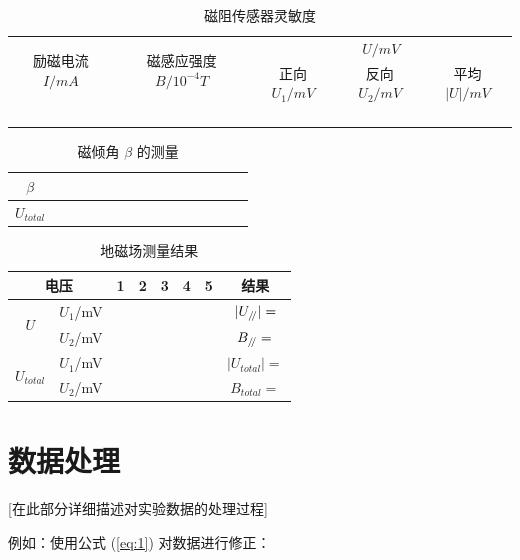 \documentclass[12pt,a4paper]{article}
\renewcommand{\parallel}{\mathrel{/ \mskip-4mu /}}
\begin{document}
	
	\begin{table}[h]
		\centering
		\caption{磁阻传感器灵敏度}
		\label{tab:bea}
		\begin{tabular}{|c|c|c|c|c|}
			\hline
			\multirow{2}{*}{励磁电流 $I/mA$} & \multirow{2}{*}{磁感应强度 $B/10^{-4}T$} & \multicolumn{3}{c|}{$U/mV$} \\ \cline{3-5} 
			&  & 正向 $U_1/mV$ & 反向 $U_2/mV$ & 平均 $|U|/mV$ \\ 
			\hline
			&  &  &  &  \\ 
			\hline
			&  &  &  &  \\ 
			\hline
			&  &  &  &  \\ 
			\hline
			&  &  &  &  \\ 
			\hline
		\end{tabular}
	\end{table}
	\begin{table}[h]
		\centering
		\caption{磁倾角 $\beta$ 的测量}
		\label{tab:beta}
		\begin{tabular}{|c|c|c|c|c|c|c|c|c|c|c|c|c|c|c|}
			\hline
			
			$\beta$ &  &  &	&	&	&	& & & & & & & & \\ \hline
			$U_{total}$ &  &  &  &	&	&	&	& & & & & & &\\ \hline
		\end{tabular}
	\end{table}
	\begin{table}[h]
		\centering
		\caption{地磁场测量结果}
		\label{tab:3}
		\begin{tabular}{|c|c|c|c|c|c|c|c|}
			\hline
			\multicolumn{2}{|c|}{电压} & 1 & 2 & 3 & 4 & 5 & 结果 \\ \hline
			\multirow{2}{*}{$U$} & $U_1$/mV &  & &  &  &  & $|U_{\parallel}| = $ \\ \cline{2-7}
			& $U_2$/mV &  &   & &  &  & $B_{\parallel} = $ \\ \hline
			\multirow{2}{*}{$U_{total}$} & $U_1$/mV &  & &  &  &  & $|U_{total}| = $ \\ \cline{2-7}
			& $U_2$/mV &  &  &  & &  & $B_{total} = $ \\ \hline
		\end{tabular}
	\end{table}
	\section{数据处理}
	[在此部分详细描述对实验数据的处理过程]
	
	例如：使用公式 (\ref{eq:1}) 对数据进行修正：
	
\end{document}
